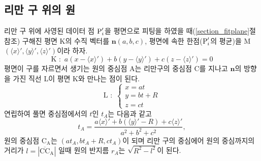 \documentclass[chapter,a4paper,10pt]{oblivoir}
\begin{document}
\subsection{리만 구 위의 원}
리만 구 위에 사영된 데이터 점 $\textrm P_i'$을 평면으로 피팅을 하였을 때(\ref{section_fitplane}절 참조)
구해진 평면 K의 수직 벡터를 $\mathbf{n}(a,b,c)$, 평면에 속한 한점($\textrm P_i'$의 평균)을
M$(\langle x\rangle',\langle y\rangle',\langle z\rangle')$이라 하자.
\begin{equation}
\textrm{K} \,\,:\,\, a(x-\langle x\rangle') + b(y-\langle y\rangle') + c(z-\langle z\rangle') = 0
\end{equation}
평면이 구를 자르면서 생기는 원의 중심점 A는 리만구의 중심점 C를 지나고
$\mathbf{n}$의 방향을 가진 직선 L이 평면 K와 만나는 점이 된다.
\begin{equation}
\textrm{L} \,\,:\,\,
\left\{
\begin{array}{ll}
x = at \\
y = bt + R\\
z = ct
\end{array}
\right.
\end{equation}
연립하여 풀면 중심점에서의 $t$인 $t_A$는 다음과 같고
\begin{equation}
t_A = \frac{a\langle x\rangle'+ b(\langle y\rangle'-R) + c\langle z\rangle'} {a^2 + b^2 + c^2},
\end{equation}
원의 중심점 $\textrm{C}_\textrm{A}$는 $(at_A, bt_A + R, ct_A)$이 되며
리만 구의 중심에어 원의 중심까지의 거리가 $l = |\overline{\textrm{CC}}_\textrm{A}|$ 일때
원의 반지름 $r_A$는 $\sqrt{R^2 - l^2}$이 된다.
\end{document}
